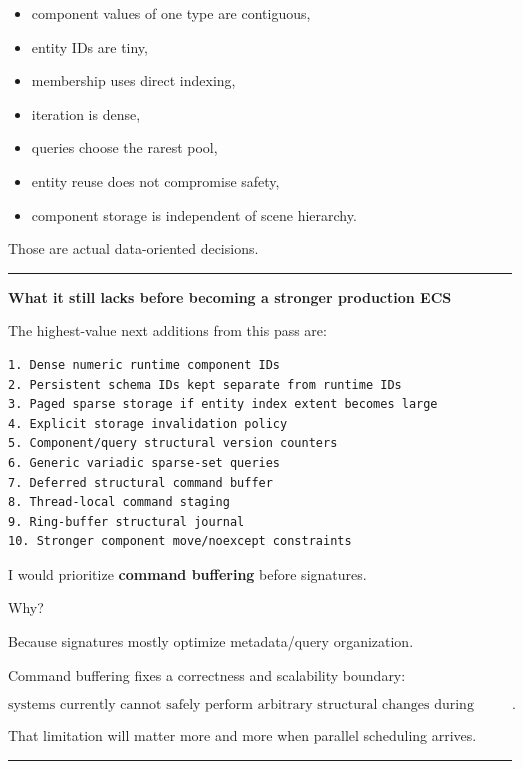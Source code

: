 \begin{itemize}
\tightlist
\item
  component values of one type are contiguous,
\item
  entity IDs are tiny,
\item
  membership uses direct indexing,
\item
  iteration is dense,
\item
  queries choose the rarest pool,
\item
  entity reuse does not compromise safety,
\item
  component storage is independent of scene hierarchy.
\end{itemize}

Those are actual data-oriented decisions.

\begin{center}\rule{0.5\linewidth}{0.5pt}\end{center}

\textbf{What it still lacks before becoming a stronger production ECS}

The highest-value next additions from this pass are:

\begin{verbatim}
1. Dense numeric runtime component IDs
2. Persistent schema IDs kept separate from runtime IDs
3. Paged sparse storage if entity index extent becomes large
4. Explicit storage invalidation policy
5. Component/query structural version counters
6. Generic variadic sparse-set queries
7. Deferred structural command buffer
8. Thread-local command staging
9. Ring-buffer structural journal
10. Stronger component move/noexcept constraints
\end{verbatim}

I would prioritize \textbf{command buffering} before signatures.

Why?

Because signatures mostly optimize metadata/query organization.

Command buffering fixes a correctness and scalability boundary:

\[
\boxed{
\text{systems currently cannot safely perform arbitrary structural changes during iteration}.
}
\]

That limitation will matter more and more when parallel scheduling arrives.

\begin{center}\rule{0.5\linewidth}{0.5pt}\end{center}

